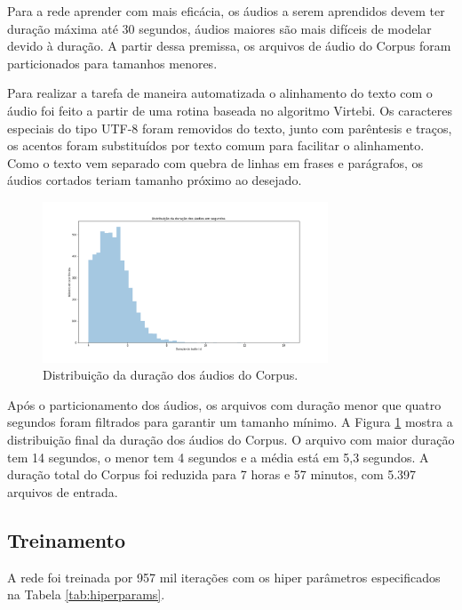 \documentclass{article}
\begin{document}
Para a rede aprender com mais eficácia, os áudios a serem aprendidos devem ter duração máxima até 30 segundos, áudios maiores são mais difíceis de modelar devido à duração. A partir dessa premissa, os arquivos de áudio do Corpus foram particionados para tamanhos menores. 

Para realizar a tarefa de maneira automatizada o alinhamento do texto com o áudio foi feito a partir de uma rotina baseada no algoritmo Virtebi. Os caracteres especiais do tipo UTF-8 foram removidos do texto, junto com parêntesis e traços, os acentos foram substituídos por texto comum para facilitar o alinhamento. Como o texto vem separado com quebra de linhas em frases e parágrafos, os áudios cortados teriam tamanho próximo ao desejado.

\begin{figure}[H]
	\begin{minipage}[b]{1.0\linewidth}
		\centering
		\centerline{\includegraphics[width=8.5cm]{Figures/dist_duracao.png}}
	\end{minipage}
	\caption{Distribuição da duração dos áudios do Corpus.}
	\label{fig:DistAudios}
\end{figure}

Após o particionamento dos áudios, os arquivos com duração menor que quatro segundos foram filtrados para garantir um tamanho mínimo. A Figura \ref{fig:DistAudios} mostra a distribuição final da duração dos áudios do Corpus. O arquivo com maior duração tem 14 segundos, o menor tem 4 segundos e a média está em 5,3 segundos. A duração total do Corpus foi reduzida para 7 horas e 57 minutos, com 5.397 arquivos de entrada.

\subsection{Treinamento}


A rede foi treinada por 957 mil iterações com os hiper parâmetros especificados na Tabela \ref{tab:hiperparams}.
\end{document}
